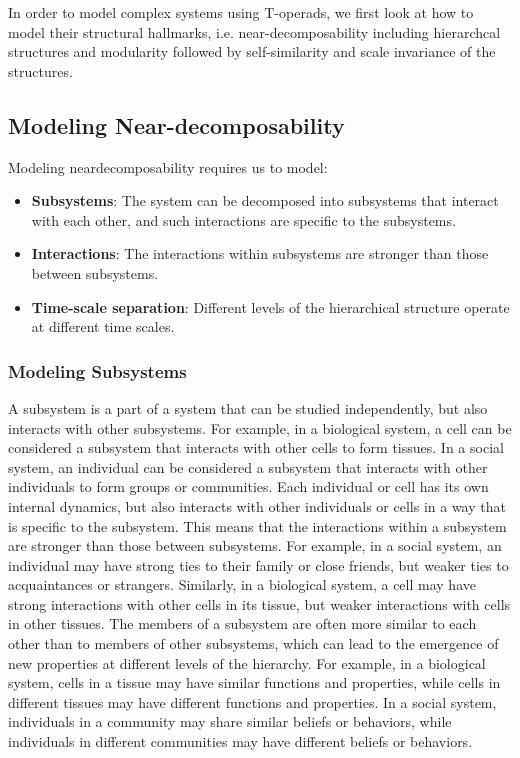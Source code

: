 In order to model complex systems using T-operads, we first look at how to model their structural hallmarks, i.e. near-decomposability including hierarchcal structures and modularity followed by self-similarity and scale invariance of the structures.

\subsection{Modeling Near-decomposability}

Modeling neardecomposability requires us to model:

\begin{itemize}
    \item \textbf{Subsystems}: The system can be decomposed into subsystems that interact with each other, and such interactions are specific to the subsystems.
    \item \textbf{Interactions}: The interactions within subsystems are stronger than those between subsystems.
    \item \textbf{Time-scale separation}: Different levels of the hierarchical structure operate at different time scales.
\end{itemize}

\subsubsection{Modeling Subsystems}

A subsystem is a part of a system that can be studied independently, but also interacts with other subsystems. For example, in a biological system, a cell can be considered a subsystem that interacts with other cells to form tissues. In a social system, an individual can be considered a subsystem that interacts with other individuals to form groups or communities. Each individual or cell has its own internal dynamics, but also interacts with other individuals or cells in a way that is specific to the subsystem. This means that the interactions within a subsystem are stronger than those between subsystems. For example, in a social system, an individual may have strong ties to their family or close friends, but weaker ties to acquaintances or strangers. Similarly, in a biological system, a cell may have strong interactions with other cells in its tissue, but weaker interactions with cells in other tissues. The members of a subsystem are often more similar to each other than to members of other subsystems, which can lead to the emergence of new properties at different levels of the hierarchy. For example, in a biological system, cells in a tissue may have similar functions and properties, while cells in different tissues may have different functions and properties. In a social system, individuals in a community may share similar beliefs or behaviors, while individuals in different communities may have different beliefs or behaviors.

